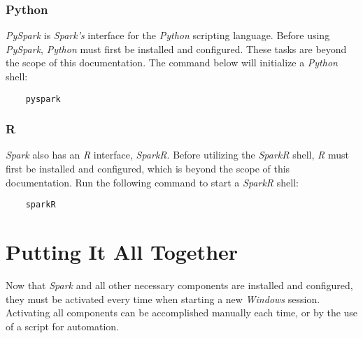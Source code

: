 \documentclass{article}
\begin{document}
    \subsubsection{Python}
    \emph{PySpark} is \emph{Spark's} interface for the \emph{Python} scripting language.
    Before using \emph{PySpark}, \emph{Python} must first be installed and configured.
    These tasks are beyond the scope of this documentation. The command below will initialize
    a \emph{Python} shell:
    \begin{verbatim}
    pyspark
    \end{verbatim}

    \subsubsection{R}
    \emph{Spark} also has an \emph{R} interface, \emph{SparkR}. Before utilizing the \emph{SparkR}
    shell, \emph{R} must first be installed and configured, which is beyond the scope of this
    documentation. Run the following command to start a \emph{SparkR} shell:
    \begin{verbatim}
    sparkR
    \end{verbatim}

\newpage
\section{Putting It All Together}
Now that \emph{Spark} and all other necessary components are installed and configured, they must be
activated every time when starting a new \emph{Windows} session. Activating all components can be
accomplished manually each time, or by the use of a script for automation.
\end{document}
